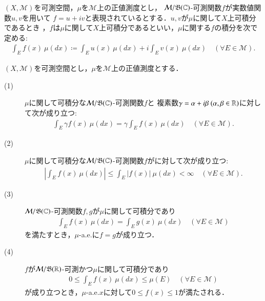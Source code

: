 	\begin{screen}
		\begin{dfn}[複素数値可測関数の正値測度に関する積分]
			$(X,\mathcal{M})$を可測空間，$\mu$を$\mathcal{M}$上の正値測度とし，
			$\mathcal{M}/\mathfrak{B}(\mathbb{C})$-可測関数$f$が実数値関数$u,v$を用いて
			$f = u + i v$と表現されているとする．$u,v$が$\mu$に関して$X$上可積分であるとき\footnotemark
			，$f$は$\mu$に関して$X$上可積分であるといい，$\mu$に関する$f$の積分を次で定める:
			\begin{align}
				\int_E f(x)\ \mu(dx)
				\coloneqq \int_E u(x)\ \mu(dx) + i \int_E v(x)\ \mu(dx)
				\quad (\forall E \in \mathcal{M}).
			\end{align}
		\end{dfn}
	\end{screen}

	\footnotetext{
		定理\ref{thm:measurability_of_complex_measurable_functions}により
		$u,v$は$\mathcal{M}/\borel{\R}$-可測である．
	}
	
	\begin{screen}
		\begin{thm}[正値測度に関する積分の性質]
			$(X,\mathcal{M})$を可測空間とし，$\mu$を$\mathcal{M}$上の正値測度とする．
			\begin{description}
				\item[(1)] $\mu$に関して可積分な$\mathcal{M}/\mathfrak{B}(\mathbb{C})$-可測関数$f$と
					複素数$\gamma = \alpha + i \beta\ (\alpha,\beta \in \R)$に対して次が成り立つ:
					\begin{align}
						\int_E \gamma f(x)\ \mu(dx) = \gamma \int_E f(x)\ \mu(dx)
						\quad (\forall E \in \mathcal{M}).
					\end{align}
					
				\item[(2)] $\mu$に関して可積分な$\mathcal{M}/\mathfrak{B}(\mathbb{C})$-可測関数$f$がに対して次が成り立つ:
					\begin{align}
						\left| \int_E f(x)\ \mu(dx) \right| \leq \int_E |f(x)|\ \mu(dx) < \infty
						\quad (\forall E \in \mathcal{M}).
					\end{align}
					
				\item[(3)] $\mathcal{M}/\mathfrak{B}(\mathbb{C})$-可測関数$f,g$が$\mu$に関して可積分であり
					\begin{align}
						\int_E f(x)\ \mu(dx) = \int_E g(x)\ \mu(dx)
						\quad (\forall E \in \mathcal{M})
					\end{align}
					を満たすとき，$\mu$-a.e.に$f = g$が成り立つ．
					
				\item[(4)] $f$が$\mathcal{M}/\borel{\R}$-可測かつ$\mu$に関して可積分であり
					\begin{align}
						0 \leq \int_E f(x)\ \mu(dx) \leq \mu(E)
						\quad (\forall E \in \mathcal{M})
					\end{align}
					が成り立つとき，$\mu$-a.e.$x$に対して$0 \leq f(x) \leq 1$が満たされる．
			\end{description}
			
		\end{thm}
	\end{screen}
	
